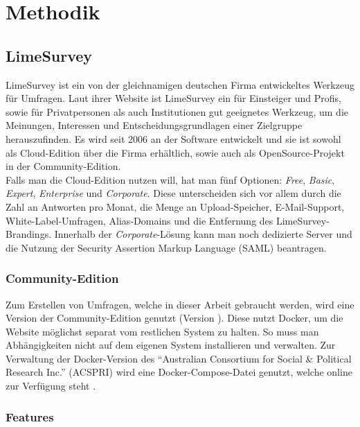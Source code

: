 \chapter{Methodik}
\label{ch:methodik}

\section{LimeSurvey}

LimeSurvey ist ein von der gleichnamigen deutschen Firma entwickeltes Werkzeug für Umfragen.
Laut ihrer Website\cite{ls} ist LimeSurvey ein für Einsteiger und Profis, sowie für Privatpersonen als auch Institutionen gut geeignetes Werkzeug, um die Meinungen, Interessen und Entscheidungsgrundlagen einer Zielgruppe herauszufinden.
Es wird seit 2006 an der Software entwickelt und sie ist sowohl als Cloud-Edition über die Firma erhältlich, sowie auch als OpenSource-Projekt in der Community-Edition.\\

Falls man die Cloud-Edition nutzen will, hat man fünf Optionen: \textit{Free}, \textit{Basic}, \textit{Expert}, \textit{Enterprise} und \textit{Corporate}.
Diese unterscheiden sich vor allem durch die Zahl an Antworten pro Monat, die Menge an Upload-Speicher, E-Mail-Support, White-Label-Umfragen, Alias-Domains und die Entfernung des LimeSurvey-Brandings.
Innerhalb der \textit{Corporate}-Lösung kann man noch dedizierte Server und die Nutzung der Security Assertion Markup Language (SAML) beantragen.

\subsection{Community-Edition}

Zum Erstellen von Umfragen, welche in dieser Arbeit gebraucht werden, wird eine Version der Community-Edition genutzt (Version ).
Diese nutzt Docker, um die Website möglichst separat vom restlichen System zu halten.
So muss man Abhängigkeiten nicht auf dem eigenen System installieren und verwalten.
Zur Verwaltung der Docker-Version des \enquote{Australian Consortium for Social \& Political Research Inc.} (ACSPRI) wird eine Docker-Compose-Datei genutzt, welche online zur Verfügung steht \cite{docker_comp}.

\subsection{Features}

